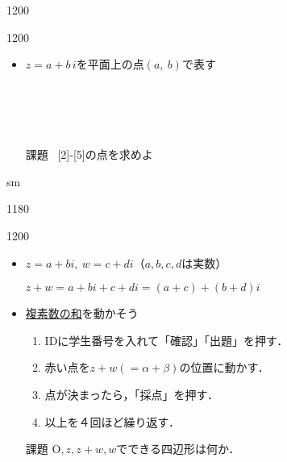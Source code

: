 \documentclass[landscape,10pt]{ujarticle}
\newcommand{\slidepage}[1][s]{%
\setcounter{ketpicctra}{18}%
\if#1m \setcounter{ketpicctra}{1}\fi
\hypersetup{linkcolor=black}%

\begin{layer}{118}{0}
\putnotee{122}{-\theketpicctra.05}{\small\thepage/\pageref{pageend}}
\end{layer}\hypersetup{linkcolor=blue}

}
\begin{document}
\begin{layer}{120}{0}
\end{layer}

{\color{red}

\begin{layer}{120}{0}
\end{layer}

}
\begin{itemize}
\item
$z=a+b\,i$を平面上の点$(a,\ b)$で表す\\
\\
\\
\\
\\
\item
[課題]\monban\ [2]-[5]の点を求めよ
\end{itemize}


\vspace*{18mm}

\slidepage

\begin{layer}{120}{0}
\end{layer}

\begin{itemize}
\item
$z=a+bi,\ w=c+di$（$a,b,c,d$は実数）
\item
[]$z+w=a+bi+c+di=(a+c)+(b+d)i$
\item
\href{https://s-takato.github.io/polytech22/offlineapp/fukusowa_ttttjsoffL.html}{複素数の和}を動かそう
\begin{enumerate}[(1)]
\item
IDに学生番号を入れて「確認」「出題」を押す．
\item
赤い点を$z+w(=\alpha+\beta)$の位置に動かす．
\item
点が決まったら，「採点」を押す．
\item
以上を４回ほど繰り返す．
\end{enumerate}
\item
[課題]\monban $\mathrm{O},z,z+w,w$でできる四辺形は何か．
\end{itemize}

\end{document}
